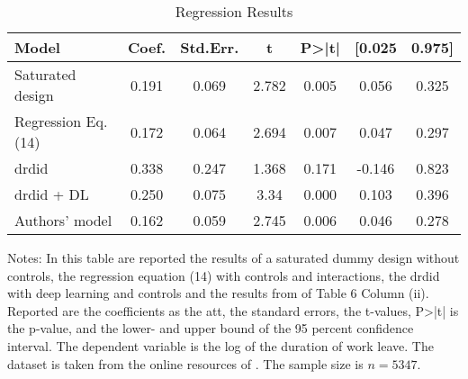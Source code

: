 \begin{table}[ht]
\centering
\begin{threeparttable}
\caption{Regression Results}
\label{tab:reg_results}
\begin{tabular}{lcccccc}
\toprule
\hline
\addlinespace
Model & Coef. & Std.Err. & t & P>|t| & [0.025 & 0.975] \\
\midrule
Saturated design & 0.191 & 0.069 & 2.782 & 0.005 & 0.056 & 0.325 \\
Regression Eq. (14)  & 0.172 & 0.064 & 2.694 & 0.007 & 0.047 & 0.297 \\
\ac{drdid} & 0.338 & 0.247 & 1.368 & 0.171 & -0.146 & 0.823 \\
\ac{drdid} + DL & 0.250 & 0.075 & 3.34 & 0.000 & 0.103 & 0.396\\
Authors' model & 0.162 & 0.059 &  2.745 & 0.006 & 0.046 & 0.278 \\
\bottomrule
\end{tabular}
\begin{tablenotes}
    \item Notes: In this table are reported the results of a saturated dummy design without controls, the regression equation (14) with controls and interactions, the \ac{drdid} with deep learning and controls and the results from \citet{meyer1990workers} of Table 6 Column (ii). Reported are the coefficients as the \ac{att}, the standard errors, the t-values, P>|t| is the p-value, and the lower- and upper bound of the 95 percent confidence interval. The dependent variable is the log of the duration of work leave. The dataset is taken from the online resources of \citet{wooldridge2019introductory}. The sample size is $n = 5347$.
\end{tablenotes}
\end{threeparttable}
\end{table}
